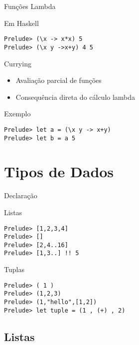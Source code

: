 \documentclass{beamer}
\begin{document}
	\begin{frame}[fragile]{Funções Lambda}
	 
	 \begin{block}{Em Haskell}
	  \begin{lstlisting}	
Prelude> (\x -> x*x) 5
Prelude> (\x y ->x+y) 4 5
	  \end{lstlisting}	  
	 \end{block}
	\end{frame}

	\begin{frame}[fragile]{Currying}
		\begin{itemize}
			\item Avaliação parcial de funções
			\item Consequência direta do cálculo lambda
		\end{itemize}
		\begin{block}{Exemplo}
		 \begin{lstlisting}
Prelude> let a = (\x y -> x+y)
Prelude> let b = a 5
		 \end{lstlisting}
		\end{block}
	\end{frame}	
	
	\section{Tipos de Dados}
	
	\begin{frame}{}
	\end{frame}
	
		\begin{frame}[fragile]{Declaração}
			\begin{block}{Listas}
		\begin{lstlisting}
Prelude> [1,2,3,4]
Prelude> []
Prelude> [2,4..16]
Prelude> [1,3..] !! 5
		 \end{lstlisting}
		\end{block}
		
		\begin{block}{Tuplas}
		\begin{lstlisting}
Prelude> ( 1 )
Prelude> (1,2,3)
Prelude> (1,"hello",[1,2])
Prelude> let tuple = (1 , (+) , 2)
		 \end{lstlisting}
		\end{block}
		
		\end{frame}
	
	\subsection{Listas}
	
\end{document}
